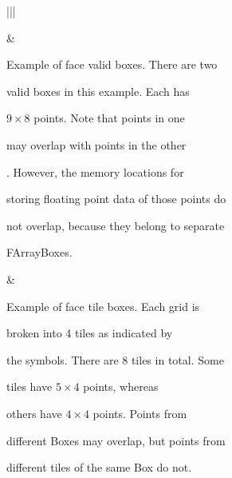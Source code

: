 \documentclass[letterpaper,10pt,english]{sphinxmanual}
\begin{document}
\begin{savenotes}\sphinxattablestart
\centering
{}
\sphinxthecaptionisattop
{}\label{\detokenize{Basics:id4}}\label{\detokenize{Basics:fig-basics-ec-comparison}}
\sphinxaftertopcaption
\begin{tabular}[t]{|*{2}{|}}
\hline

\sphinxAtStartPar
{}
&
\sphinxAtStartPar
{}
\\
\hline
\begin{DUlineblock}{0em}
\item[] Example of face valid boxes. There are two
\item[] valid boxes in this example. Each has
\item[] \(9\times 8\) points. Note that points in one
\item[]  may overlap with points in the other
\item[] . However, the memory locations for
\item[] storing floating point data of those points do
\item[] not overlap, because they belong to separate
\item[] FArrayBoxes.
\end{DUlineblock}
&
\begin{DUlineblock}{0em}
\item[] Example of face tile boxes. Each grid is
\item[]  broken into 4 tiles as indicated by
\item[] the symbols. There are 8 tiles in total. Some
\item[] tiles have \(5\times 4\) points, whereas
\item[] others have \(4 \times 4\) points. Points from
\item[] different Boxes may overlap, but points from
\item[] different tiles of the same Box do not.
\end{DUlineblock}
\\
\hline
\end{tabular}
\par
\sphinxattableend\end{savenotes}
\end{document}
